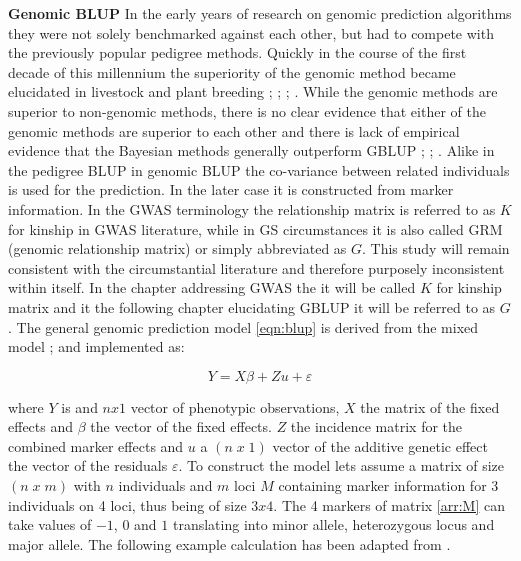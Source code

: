 \textbf{Genomic BLUP} \newline In the early years of research on genomic prediction algorithms they were not
solely benchmarked against each other, but had to compete with the previously popular pedigree
methods. Quickly in the course of the first decade of this millennium the superiority of the genomic method
became elucidated in livestock and plant breeding \cite{habier2007impact}; \cite{vanraden2008efficient};
\cite{vanraden2008reliability}; \cite{harris2009genomic}. While the genomic methods are superior to
non-genomic methods, there is no clear evidence that either of the genomic methods are superior to each other
and there is lack of empirical evidence that the Bayesian methods generally outperform GBLUP
\cite{moser2009comparison} ; \cite{bernardo2010breeding}; \cite{azodi2019}. Alike in the pedigree BLUP in
genomic BLUP the co-variance between related individuals is used for the prediction. In the later case it is
constructed from marker information. In the GWAS terminology the relationship matrix is referred to as $K$ for
kinship in GWAS literature, while in GS circumstances it is also called GRM (genomic relationship matrix) or
simply abbreviated as $G$. This study will remain consistent with the circumstantial literature and therefore
purposely inconsistent within itself. In the chapter addressing GWAS the it will be called $K$ for kinship
matrix and it the following chapter elucidating GBLUP it will be referred to as $G$. The general genomic
prediction model \ref{eqn:blup} is derived from the mixed model \cite{henderson1975best};
\cite{vanraden2008efficient} and implemented as:

\begin{equation}
Y = X \beta + Zu + \varepsilon
 \label{eqn:blup}
\end{equation}

where $Y$ is and $nx1$ vector of phenotypic observations, $X$ the matrix of the fixed effects and $\beta$ the
vector of the fixed effects. $Z$ the incidence matrix for the combined marker effects and $u$ a $(n\; x\; 1)$ vector
of the additive genetic effect the vector of the residuals $\varepsilon$. To construct the model lets assume
a matrix of size $(n\; x\; m)$ with $n$ individuals and $m$ loci $M$ containing marker information for 3
individuals on 4 loci, thus being of size $3x4$. The 4 markers of matrix \ref{arr:M} can take values of $-1$,
$0$ and $1$ translating into minor allele, heterozygous locus and major allele. The following example
calculation has been adapted from \cite{isik2013}.

